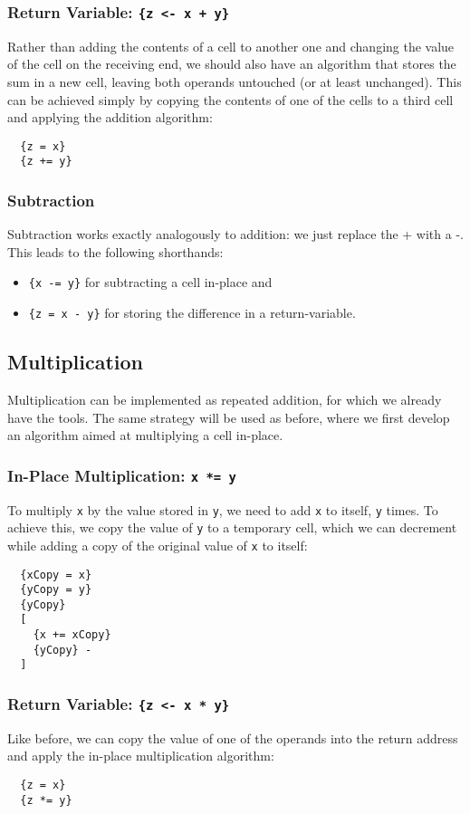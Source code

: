\subsubsection{Return Variable: \texttt{\{z <- x + y\}}}
Rather than adding the contents of a cell to another one and changing the value of the cell on the receiving end, we should also have an algorithm that stores the sum in a new cell, leaving both operands untouched (or at least unchanged). This can be achieved simply by copying the contents of one of the cells to a third cell and applying the addition algorithm:
\begin{lstlisting}
  {z = x}
  {z += y}
\end{lstlisting}

\subsubsection{Subtraction}
Subtraction works exactly analogously to addition: we just replace the + with a -. This leads to the following shorthands:
\begin{itemize}
\item \texttt{\{x -= y\}} for subtracting a cell in-place and
\item \texttt{\{z = x - y\}} for storing the difference in a return-variable.
\end{itemize}

\subsection{Multiplication}
Multiplication can be implemented as repeated addition, for which we already have the tools. The same strategy will be used as before, where we first develop an algorithm aimed at multiplying a cell in-place.
\subsubsection{In-Place Multiplication: \texttt{x *= y}}
To multiply \texttt{x} by the value stored in \texttt{y}, we need to add \texttt{x} to itself, \texttt{y} times. To achieve this, we copy the value of \texttt{y} to a temporary cell, which we can decrement while adding a copy of the original value of \texttt{x} to itself:
\begin{lstlisting}
  {xCopy = x}
  {yCopy = y}
  {yCopy}
  [
    {x += xCopy}
    {yCopy} -
  ]
\end{lstlisting}

\subsubsection{Return Variable: \texttt{\{z <- x * y\}}}
Like before, we can copy the value of one of the operands into the return address and apply the in-place multiplication algorithm:
\begin{lstlisting}
  {z = x}
  {z *= y}
\end{lstlisting}

